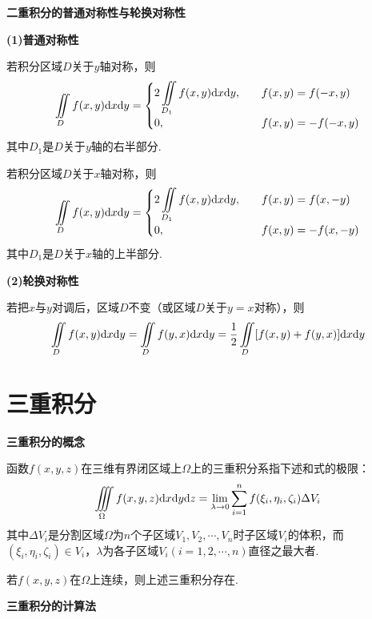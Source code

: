 \textbf{二重积分的普通对称性与轮换对称性}

\textbf{(1)普通对称性}

若积分区域$D$关于$y$轴对称，则
\begin{equation*}
    \iint \limits_{D} f(x,y)\mathrm{d} x\mathrm{d} y=
    \begin{cases}
        2\displaystyle\iint \limits_{D_1} f(x,y)\mathrm{d} x\mathrm{d} y, \quad & f(x,y)=f(-x,y) \\
        0,  & f(x,y)=-f(-x,y)
    \end{cases}
\end{equation*}
其中$D_1$是$D$关于$y$轴的右半部分.

若积分区域$D$关于$x$轴对称，则
\begin{equation*}
    \iint \limits_{D} f(x,y)\mathrm{d} x\mathrm{d} y=
    \begin{cases}
        2\displaystyle\iint \limits_{D_1} f(x,y)\mathrm{d} x\mathrm{d} y, \quad & f(x,y)=f(x,-y) \\
        0,  & f(x,y)=-f(x,-y)
    \end{cases}
\end{equation*}
其中$D_1$是$D$关于$x$轴的上半部分.

\textbf{(2)轮换对称性}

若把$x$与$y$对调后，区域$D$不变（或区域$D$关于$y=x$对称），则
\begin{equation*}
    \iint \limits_{D} f(x,y)\mathrm{d} x\mathrm{d} y=\iint \limits_{D} f(y,x)\mathrm{d} x\mathrm{d} y=\dfrac{1}{2}\iint \limits_{D} [f(x,y)+f(y,x)]\mathrm{d} x\mathrm{d} y
\end{equation*}

\section{三重积分}
\textbf{三重积分的概念}

函数$f(x,y,z)$在三维有界闭区域上$\Omega$上的三重积分系指下述和式的极限：
\begin{equation*}
    \iiint \limits_{\Omega} f(x,y,z)\mathrm{d} x\mathrm{d} y\mathrm{d} z=\lim_{\lambda\rightarrow 0}\sum_{i=1}^n f(\xi_i, \eta_i, \zeta_i)\Delta V_i
\end{equation*}
其中$\Delta V_i$是分割区域$\Omega$为$n$个子区域$V_1,V_2,\cdots,V_n$时子区域$V_i$的体积，而$(\xi_i, \eta_i, \zeta_i)\in V_i$，$\lambda$为各子区域$V_i(i=1,2,\cdots,n)$直径之最大者.

若$f(x,y,z)$在$\Omega$上连续，则上述三重积分存在.

\textbf{三重积分的计算法}

